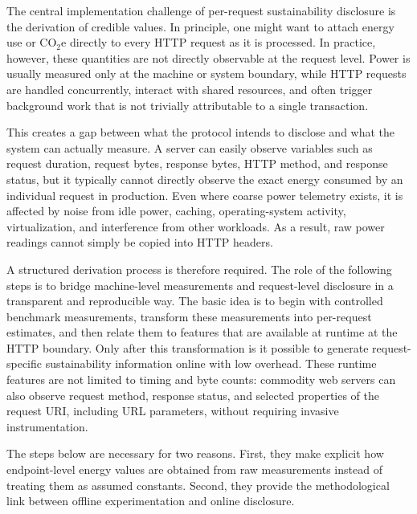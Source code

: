The central implementation challenge of per-request sustainability disclosure is the derivation of credible values. In principle, one might want to attach energy use or \(\mathrm{CO_2e}\) directly to every HTTP request as it is processed. In practice, however, these quantities are not directly observable at the request level. Power is usually measured only at the machine or system boundary, while HTTP requests are handled concurrently, interact with shared resources, and often trigger background work that is not trivially attributable to a single transaction.

This creates a gap between what the protocol intends to disclose and what the system can actually measure. A server can easily observe variables such as request duration, request bytes, response bytes, HTTP method, and response status, but it typically cannot directly observe the exact energy consumed by an individual request in production. Even where coarse power telemetry exists, it is affected by noise from idle power, caching, operating-system activity, virtualization, and interference from other workloads. As a result, raw power readings cannot simply be copied into HTTP headers.

A structured derivation process is therefore required. The role of the following steps is to bridge machine-level measurements and request-level disclosure in a transparent and reproducible way. The basic idea is to begin with controlled benchmark measurements, transform these measurements into per-request estimates, and then relate them to features that are available at runtime at the HTTP boundary. Only after this transformation is it possible to generate request-specific sustainability information online with low overhead. These runtime features are not limited to timing and byte counts: commodity web servers can also observe request method, response status, and selected properties of the request URI, including URL parameters, without requiring invasive instrumentation.

The steps below are necessary for two reasons. First, they make explicit how endpoint-level energy values are obtained from raw measurements instead of treating them as assumed constants. Second, they provide the methodological link between offline experimentation and online disclosure.
